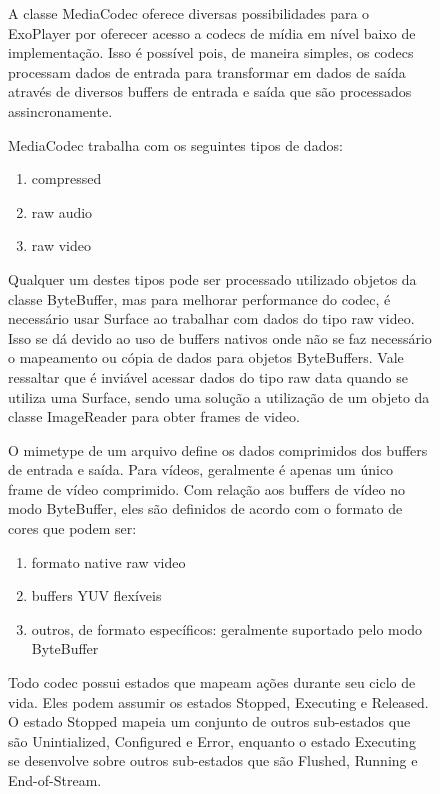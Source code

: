 \documentclass[sigconf]{acmart}
\begin{document}
\begin{figure}[h!]
A classe MediaCodec oferece diversas possibilidades para o ExoPlayer por oferecer acesso a codecs de mídia em nível baixo de implementação. Isso é possível pois, de maneira simples, os codecs processam dados de entrada para transformar em dados de saída através de diversos buffers de entrada e saída que são processados assincronamente.

MediaCodec trabalha com os seguintes tipos de dados:

\begin{enumerate}
    \item compressed
    \item raw audio
    \item raw video
\end{enumerate}

Qualquer um destes tipos pode ser processado utilizado objetos da classe ByteBuffer, mas para melhorar performance do codec, é necessário usar Surface ao trabalhar com dados do tipo raw video. Isso se dá devido ao uso de buffers nativos onde não se faz necessário o mapeamento ou cópia de dados para objetos ByteBuffers. Vale ressaltar que é inviável acessar dados do tipo raw data quando se utiliza uma Surface, sendo uma solução a utilização de um objeto da classe ImageReader para obter frames de video.

O mimetype de um arquivo define os dados comprimidos dos buffers de entrada e saída. Para vídeos, geralmente é apenas um único frame de vídeo comprimido. Com relação aos buffers de vídeo no modo ByteBuffer, eles são definidos de acordo com o formato de cores que podem ser:

\begin{enumerate}
    \item formato native raw video
    \item buffers YUV flexíveis
    \item outros, de formato específicos: geralmente suportado pelo modo ByteBuffer
\end{enumerate}


Todo codec possui estados que mapeam ações durante seu ciclo de vida. Eles podem assumir os estados Stopped, Executing e Released. O estado Stopped mapeia um conjunto de outros sub-estados que são Unintialized, Configured e Error, enquanto o estado Executing se desenvolve sobre outros sub-estados que são Flushed, Running e End-of-Stream.


\end{figure}
\end{document}
